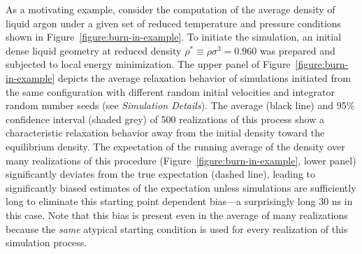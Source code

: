 \documentclass[aps,pre,twocolumn,nofootinbib,superscriptaddress,linenumbers,11point]{revtex4-1}
\begin{document}
As a motivating example, consider the computation of the average density of liquid argon under a given set of reduced temperature and pressure conditions shown in Figure~\ref{figure:burn-in-example}.
To initiate the simulation, an initial dense liquid geometry at reduced density $\rho^* \equiv \rho \sigma^3 = 0.960$ was prepared and subjected to local energy minimization.
The upper panel of Figure~\ref{figure:burn-in-example} depicts the average relaxation behavior of simulations initiated from the same configuration with different random initial velocities and integrator random number seeds (see \emph{Simulation Details}).
The average (black line) and 95\% confidence interval (shaded grey) of 500 realizations of this process show a characteristic relaxation behavior away from the initial density toward the equilibrium density.
The expectation of the running average of the density over many realizations of this procedure ({Figure~\ref{figure:burn-in-example}, lower panel}) significantly deviates from the true expectation (dashed line), leading to significantly biased estimates of the expectation unless simulations are sufficiently long to eliminate this starting point dependent bias---a surprisingly long 30 ns in this case.
Note that this bias is present even in the average of many realizations because the \emph{same} atypical starting condition is used for every realization of this simulation process.


\end{document}
